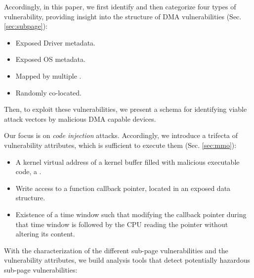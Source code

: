 
Accordingly, in this paper, we first identify and then categorize four types of \subpage{} vulnerability, providing insight into the structure of DMA vulnerabilities (Sec. \ref{sec:subpage}):
\begin{itemize}
    \item Exposed Driver metadata.
    \item Exposed OS metadata. 
    \item Mapped by multiple \iova.
    \item Randomly co-located.
\end{itemize}
Then, to exploit these vulnerabilities, we present a schema for identifying viable attack vectors by malicious DMA capable devices. 

Our focus is on \emph{code injection} attacks. Accordingly, we introduce a trifecta of vulnerability attributes, which is sufficient to execute them (Sec. \ref{sec:mmo}):

\begin{itemize}
    \item A kernel virtual address of a kernel buffer filled with malicious executable code, a \mabaf.
    \item Write access to a function callback pointer, located in an exposed data structure.
    \item Existence of a time window such that modifying the callback pointer during that time window is followed by the CPU reading the pointer without altering its content. 
\end{itemize} 

With the characterization of the different sub-page vulnerabilities and the vulnerability attributes, we build analysis tools that detect potentially hazardous sub-page vulnerabilities:

